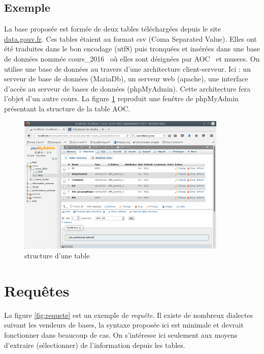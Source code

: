 \subsection{Exemple}
La base proposée est formée de deux tables téléchargées depuis le site \href{http://www.data.gouv.fr}{data.gouv.fr}.
Ces tables étaient au format csv (Coma Separated Value). Elles ont été traduites dans le bon encodage (utf8) puis tronquées et insérées dans une base de données nommée \og cours\_2016\fg~ où elles sont désignées par \og AOC\fg~ et \og musees\fg. \newline
On utilise une base de données au travers d'une architecture client-serveur. Ici : un serveur de base de données (MariaDb), un serveur web (apache), une interface d'accès au serveur de bases de données (phpMyAdmin). Cette architecture fera l'objet d'un autre cours.\newline
La figure \ref{fig:aoc} reproduit une fenêtre de phpMyAdmin présentant la structure de la table \og AOC\fg.
\begin{figure}[h]
  \centering
  \includegraphics[width=10cm]{./introbdd_aoc.png}
  \caption{structure d'une table}
  \label{fig:aoc}
\end{figure}


\section{Requêtes}
La figure \ref{fig:requete} est un exemple de \emph{requête}. Il existe de nombreux dialectes suivant les vendeurs de bases, la syntaxe proposée ici est minimale et devrait fonctionner dans beaucoup de cas. 
On s'intéresse ici seulement aux moyens d'extraire (sélectionner) de l'information depuis les tables.
